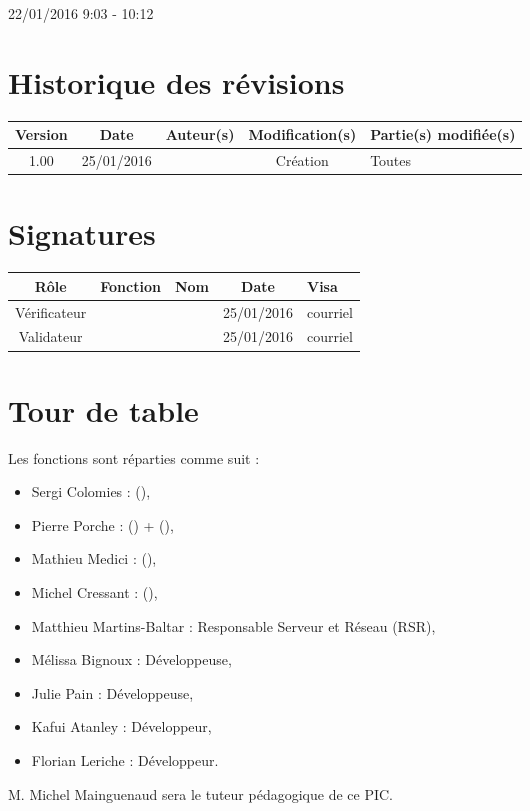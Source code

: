 \documentclass [a4paper] {article}
\begin{document}
22/01/2016			 				%
\hfill   
\hfill 	 9:03 - 10:12 				%


\section*{Historique des révisions}
\begin{center}
			\begin{tabular}{| c | c | c | c | p{4cm} |}
				\hline
				\rowcolor{Gray}
				Version & Date & Auteur(s) & Modification(s) & Partie(s) modifiée(s)		 \\
				\hline
				1.00 & 25/01/2016 & \Pierre & Création & Toutes \\
		\hline		
			\end{tabular}
		\end{center}

\section*{Signatures}

		\begin{center}
			\begin{tabular}{| c | c | c | c | p{4cm} |}
				\hline
				\rowcolor{Gray}
				Rôle & Fonction & Nom & Date & Visa		 \\
				\hline
				Vérificateur & \RQA & \Kafui & 25/01/2016 & courriel \\[30pt]
				\hline
				Validateur & \CP & \Sergi & 25/01/2016 & courriel \\[30pt]	
				\hline
			\end{tabular}
		\end{center}


\section{Tour de table}
Les fonctions sont réparties comme suit :
\begin{itemize}
	\item Sergi Colomies : \CP (\CPCourt),
	\item Pierre Porche : \RQ (\RQCourt) + \CPA (\CPACourt),
	\item Mathieu Medici : \RGC (\RGCCourt),
	\item Michel Cressant : \RD (\RDCourt),
	\item Matthieu Martins-Baltar : Responsable Serveur et Réseau (RSR),		
	\item Mélissa Bignoux : Développeuse,
	\item Julie Pain : Développeuse,
	\item Kafui Atanley : Développeur,
	\item Florian Leriche : Développeur.


\end{itemize}
M. Michel Mainguenaud sera le tuteur pédagogique de ce PIC.
\end{document}
